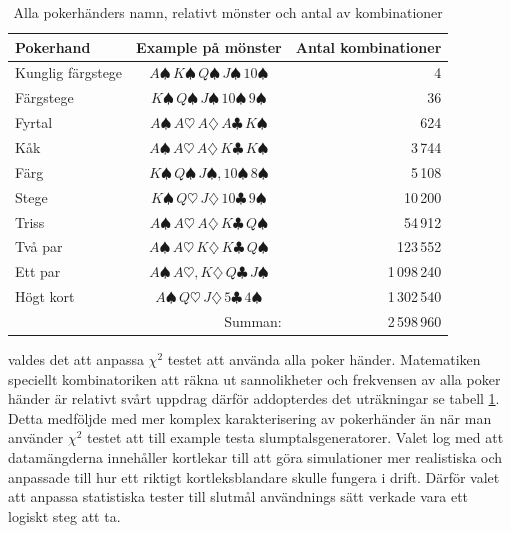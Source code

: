 \documentclass[swedish,a4paper]{article}
\begin{document}
\begin{table}[ht] 
\captionsetup{justification=centering,margin=4cm}
\caption{Alla pokerhänders namn, relativt mönster och antal av kombinationer }
\label{tab:all_poker_hands}
	\centering
	\begin{tabular}{|l|c|r|}
	
	\hline 
	Pokerhand 
	& Example på mönster 
	& Antal kombinationer 
	\\ \hline  

	Kunglig färgstege 
	& $A\spadesuit\, K\spadesuit\, Q\spadesuit\, J\spadesuit\, 10\spadesuit$
	& 4 
	\\ \hline

	Färgstege
	& $K\spadesuit\, Q\spadesuit\, J\spadesuit\, 10\spadesuit\, 9\spadesuit$
	& 36 
	\\ \hline

	Fyrtal 
	& $A\spadesuit\,A\heartsuit\,A\diamondsuit\,A\clubsuit\, K\spadesuit$ 
	& 624 
	\\ \hline

	Kåk 
	& $A\spadesuit\, A\heartsuit\, A\diamondsuit\, K\clubsuit\,K\spadesuit$ 
	& 3\,744
	\\ \hline

	Färg
	& $K\spadesuit\, Q\spadesuit\, J\spadesuit, 10\spadesuit\, 8\spadesuit$
	& 5\,108
	\\ \hline

	Stege 
	& $K\spadesuit\, Q\heartsuit\, J\diamondsuit\, 10\clubsuit\,9\spadesuit$ 
	& 10\,200
	\\ \hline
	Triss 
	& $A\spadesuit\, A\heartsuit\, A\diamondsuit\, K\clubsuit\, Q\spadesuit$
	& 54\,912
	\\ \hline

	Två par 
	& $A\spadesuit\, A\heartsuit\, K\diamondsuit\, K\clubsuit\, Q\spadesuit$
	& 123\,552
	\\ \hline

	Ett par 
	& $A\spadesuit\, A\heartsuit, K\diamondsuit\, Q\clubsuit\, J\spadesuit$ 
	& 1\,098\,240 
	\\ \hline

	Högt kort
	& $A\spadesuit\, Q\heartsuit\, J\diamondsuit\, 5\clubsuit\, 4\spadesuit$
	& 1\,302\,540
	\\ \hline

	 
	\multicolumn{2}{|r|}{Summan:} 
	& 2\,598\,960 
	\\ \hline
\end{tabular}
\end{table}

valdes det att anpassa $\chi^2$ testet att använda alla poker händer. Matematiken
speciellt kombinatoriken att räkna ut sannolikheter och frekvensen av alla poker\-
händer är relativt svårt uppdrag därför addopterdes det \textcite{Drew2006} 
uträkningar se tabell \ref{tab:all_poker_hands}. Detta medföljde med mer komplex
karakterisering av poker\-händer än när man använder $\chi^2$ testet 
att till example testa slumptalsgeneratorer. Valet log med att datamängderna 
innehåller kortlekar till att göra simulationer mer  realistiska och anpassade
till hur ett riktigt kortleksblandare skulle fungera i drift. Därför valet att
anpassa statistiska tester till slutmål användnings sätt verkade vara ett
logiskt steg att ta.
\end{document}

